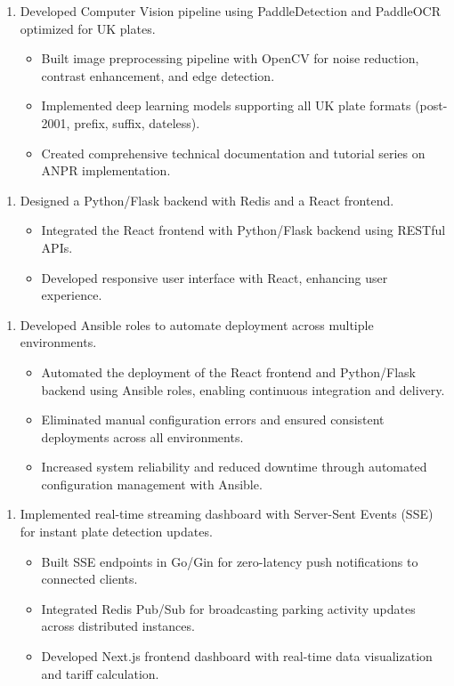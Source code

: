 \documentclass{article}
\begin{document}
\begin{enumerate}
    \item[] Developed Computer Vision pipeline using PaddleDetection and PaddleOCR optimized for UK plates.
   \begin{itemize}
    \item Built image preprocessing pipeline with OpenCV for noise reduction, contrast enhancement, and edge detection.
    \item Implemented deep learning models supporting all UK plate formats (post-2001, prefix, suffix, dateless).
    \item Created comprehensive technical documentation and tutorial series on ANPR implementation.
   \end{itemize}
\end{enumerate}


\begin{enumerate}
    \item[] Designed a Python/Flask backend with Redis and a React frontend. 
   \begin{itemize}
    \item Integrated the React frontend with Python/Flask backend using RESTful APIs.
    \item Developed responsive user interface with React, enhancing user experience.
   \end{itemize}
\end{enumerate}


\begin{enumerate}
    \item[] Developed Ansible roles to automate deployment across multiple environments.
   \begin{itemize}
    \item Automated the deployment of the React frontend and Python/Flask backend using Ansible roles, enabling continuous integration and delivery.
    \item Eliminated manual configuration errors and ensured consistent deployments across all environments.  
    \item Increased system reliability and reduced downtime through automated configuration management with Ansible.
   \end{itemize}
\end{enumerate}

\begin{enumerate}
    \item[] Implemented real-time streaming dashboard with Server-Sent Events (SSE) for instant plate detection updates.
    \begin{itemize}
    \item Built SSE endpoints in Go/Gin for zero-latency push notifications to connected clients.
    \item Integrated Redis Pub/Sub for broadcasting parking activity updates across distributed instances.
    \item Developed Next.js frontend dashboard with real-time data visualization and tariff calculation.
    \end{itemize}
 \end{enumerate}
\end{document}
